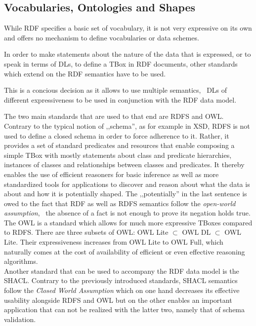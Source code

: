\subsection{Vocabularies, Ontologies and Shapes}
\label{ssec:onto}
While \ac{RDF} specifies a basic set of vocabulary, it is not very expressive on its own and offers no mechanism to define vocabularies or data schemes.

In order to make statements about the nature of the data that is expressed, or to speak in terms of \acp{DL}, to define a TBox in \ac{RDF} documents, other standards which extend on the \ac{RDF} semantics have to be used.

This is a concious decision as it allows to use multiple semantics, \ie~\acp{DL} of different expressiveness to be used in conjunction with the \ac{RDF} data model.

The two main standards that are used to that end are \ac{RDFS} and \ac{OWL}.\\

Contrary to the typical notion of ,,schema'', as for example in \ac{XSD}, \ac{RDFS} is not used to define a closed schema in order to force adherence to it.
Rather, it provides a set of standard predicates and resources that enable composing a simple TBox with mostly statements about class and predicate hierarchies, instances of classes and relationships between classes and predicates.
It thereby enables the use of efficient reasoners for basic inference as well as more standardized tools for applications to discover and reason about what the data is about and how it is potentially shaped.
The ,,potentially'' in the last sentence is owed to the fact that \ac{RDF} as well as \ac{RDFS} semantics follow the \emph{open-world assumption}, \ie~the absence of a fact is not enough to prove its negation holds true.\\

The \acl{OWL} is a standard which allows for much more expressive TBoxes compared to \ac{RDFS}.
There are three subsets of \ac{OWL}: \ac{OWL} Lite $\subset$ \ac{OWL} DL $\subset$ \ac{OWL} Lite.
Their expressiveness increases from \ac{OWL} Lite to \ac{OWL} Full, which naturally comes at the cost of availability of efficient or even effective reasoning algorithms.\\

Another standard that can be used to accompany the \ac{RDF} data model is the \acf{SHACL}.
Contrary to the previously introduced standards, \ac{SHACL} semantics follow the \emph{Closed World Assumption} which on one hand decreases its effective usability alongside \ac{RDFS} and \ac{OWL} but on the other enables an important application that can not be realized with the latter two, namely that of schema validation.

